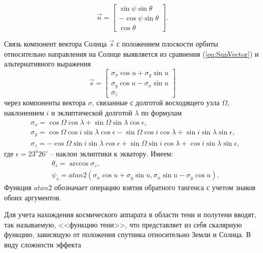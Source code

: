 \begin{equation}
  \vec{n} = \begin{bmatrix}
     \sin\psi\sin\theta \\
    -\cos\psi\sin\theta \\
     \cos\theta
  \end{bmatrix}.
\end{equation}\par
Связь компонент вектора Солнца $\vec{s}$ с положением плоскости орбиты относительно
направления на Солнце выявляется из сравнения (\ref{eq:SunVector}) и альтернативного
выражения
\begin{equation}
  \vec{s} = \begin{bmatrix}
    \sigma_x\cos u + \sigma_y\sin u \\
    \sigma_y\cos u - \sigma_x\sin u \\
    \sigma_z
  \end{bmatrix}
\end{equation}
через компоненты вектора $\sigma$, связанные с долготой восходящего узла $\Omega$,
наклонением $i$ и эклиптической долготой $\lambda$ по формулам
\begin{equation}
\begin{aligned}
    & \sigma_x =  \cos\Omega\cos\lambda + \sin\Omega\sin\lambda\cos\epsilon, \\
    & \sigma_y =  \cos\Omega\cos i\sin\lambda\cos\epsilon - \sin\Omega\cos i\cos\lambda + \sin i\sin\lambda\sin\epsilon, \\
    & \sigma_z = -\cos\Omega\sin i\sin\lambda\cos\epsilon + \sin\Omega\sin i\cos\lambda + \cos i\sin\lambda\sin\epsilon,
\end{aligned}
\end{equation}
где $\epsilon = 23^o26'$ -- наклон эклиптики к экватору. Имеем:
\begin{equation}
  \begin{aligned}
    & \theta_s = \arccos\sigma_z, \\
    & \psi_s = atan2(\sigma_x\cos u + \sigma_y\sin u, \sigma_x\sin u - \sigma_y\cos u).
  \end{aligned}
\end{equation}
Функция $atan2$ обозначает операцию взятия обратного тангенса с учетом знаков
обоих аргументов.\par
    Для учета нахождения космического аппарата в области тени и полутени вводят,
так называемую, <<функцию тени>>, что представляет из себя скалярную функцию, зависящую
от положения спутника относительно Земли и Солнца. В виду сложности эффекта
